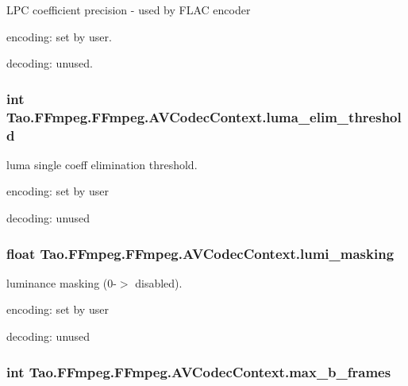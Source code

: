 \label{struct_tao_1_1_f_fmpeg_1_1_f_fmpeg_1_1_a_v_codec_context_a9e10bf5598d185c7df9399751a1141cf}
LPC coefficient precision -\/ used by FLAC encoder
\begin{DoxyItemize}
\item encoding: set by user.
\item decoding: unused. 
\end{DoxyItemize}\hypertarget{struct_tao_1_1_f_fmpeg_1_1_f_fmpeg_1_1_a_v_codec_context_a0e4585430e070d0eb48b2394cc8b1a5d}{
\subsubsection[{luma\_\-elim\_\-threshold}]{\setlength{\rightskip}{0pt plus 5cm}int {\bf Tao.FFmpeg.FFmpeg.AVCodecContext.luma\_\-elim\_\-threshold}}}
\label{struct_tao_1_1_f_fmpeg_1_1_f_fmpeg_1_1_a_v_codec_context_a0e4585430e070d0eb48b2394cc8b1a5d}
luma single coeff elimination threshold.
\begin{DoxyItemize}
\item encoding: set by user
\item decoding: unused 
\end{DoxyItemize}\hypertarget{struct_tao_1_1_f_fmpeg_1_1_f_fmpeg_1_1_a_v_codec_context_a0540e23adeac7fbe6dab0166868da0cd}{
\subsubsection[{lumi\_\-masking}]{\setlength{\rightskip}{0pt plus 5cm}float {\bf Tao.FFmpeg.FFmpeg.AVCodecContext.lumi\_\-masking}}}
\label{struct_tao_1_1_f_fmpeg_1_1_f_fmpeg_1_1_a_v_codec_context_a0540e23adeac7fbe6dab0166868da0cd}
luminance masking (0-\/$>$ disabled).
\begin{DoxyItemize}
\item encoding: set by user
\item decoding: unused 
\end{DoxyItemize}\hypertarget{struct_tao_1_1_f_fmpeg_1_1_f_fmpeg_1_1_a_v_codec_context_a4a4ab0f9d4445b172e83883d1802b0fd}{
\subsubsection[{max\_\-b\_\-frames}]{\setlength{\rightskip}{0pt plus 5cm}int {\bf Tao.FFmpeg.FFmpeg.AVCodecContext.max\_\-b\_\-frames}}}
